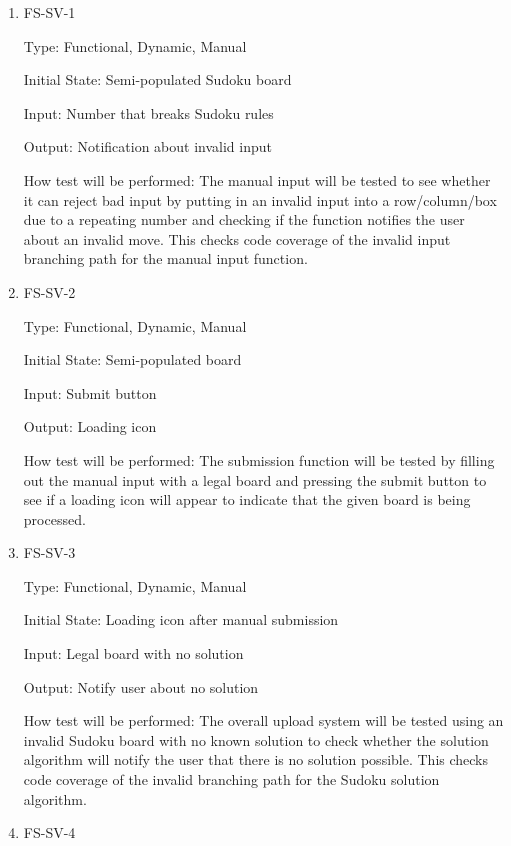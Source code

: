 \documentclass[11pt]{article}
\begin{document}
\begin{enumerate}

\item{FS-SV-1\\}

Type: Functional, Dynamic, Manual
					
Initial State: Semi-populated Sudoku board
					
Input: Number that breaks Sudoku rules
					
Output: Notification about invalid input
					
How test will be performed: The manual input will be tested to see whether it can reject bad input by putting in an invalid input into a row/column/box due to a repeating number and checking if the function notifies the user about an invalid move. This checks code coverage of the invalid input branching path for the manual input function.
					
\item{FS-SV-2\\}

Type: Functional, Dynamic, Manual
					
Initial State: Semi-populated board
					
Input: Submit button
					
Output: Loading icon
					
How test will be performed: The submission function will be tested by filling out the manual input with a legal board and pressing the submit button to see if a loading icon will appear to indicate that the given board is being processed.

\item{FS-SV-3\\}

Type: Functional, Dynamic, Manual
					
Initial State: Loading icon after manual submission
					
Input: Legal board with no solution
					
Output: Notify user about no solution
					
How test will be performed: The overall upload system will be tested using an invalid Sudoku board with no known solution to check whether the solution algorithm will notify the user that there is no solution possible. This checks code coverage of the invalid branching path for the Sudoku solution algorithm.

\item{FS-SV-4\\}


\end{enumerate}
\end{document}
